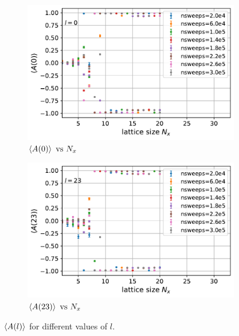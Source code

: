 \documentclass[../thesis_main.tex]{subfiles}
\begin{document}
\begin{figure}[t!]
    \centering
    \begin{subfigure}[b]{0.47\textwidth}
        \centering
        \includegraphics[width=\textwidth]{images/expval(A_l)_vs_N_x/A vs N_x (l=0).pdf}
        \caption{$\expval{A(0)} \text{ vs } N_x$}
    \end{subfigure}
    \hspace{1em}  %
    \begin{subfigure}[b]{0.47\textwidth}
        \centering
        \includegraphics[width=\textwidth]{images/expval(A_l)_vs_N_x/A vs N_x (l=23).pdf}
        \caption{$\expval{A(23)} \text{ vs } N_x$}
    \end{subfigure}
    \caption{$\expval{A(l)}$ for different values of $l$.}
    \label{SSB}
\end{figure}
\end{document}
